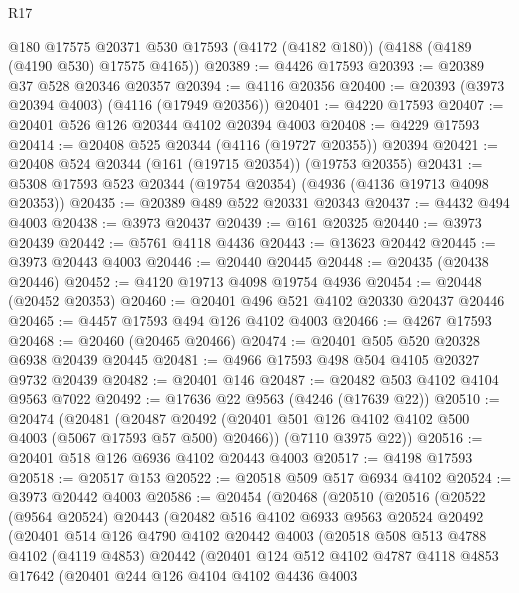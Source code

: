 \begin{lexlean}{R17}
\begin{coremodule}
    @180
    @17575
    @20371
    @530
    @17593
    (@4172 (@4182 @180))
    (@4188 (@4189 (@4190 @530) @17575 @4165))
@20389 := @4426 @17593
@20393 := @20389 @37 @528 @20346 @20357
@20394 := @4116 @20356
@20400 := @20393 (@3973 @20394 @4003) (@4116 (@17949 @20356))
@20401 := @4220 @17593
@20407 := @20401 @526 @126 @20344 @4102 @20394 @4003
@20408 := @4229 @17593
@20414 := @20408 @525 @20344 (@4116 (@19727 @20355)) @20394
@20421 := @20408 @524 @20344 (@161 (@19715 @20354)) (@19753 @20355)
@20431 := @5308 @17593 @523 @20344 (@19754 @20354) (@4936 (@4136 @19713 @4098 @20353))
@20435 := @20389 @489 @522 @20331 @20343
@20437 := @4432 @494 @4003
@20438 := @3973 @20437
@20439 := @161 @20325
@20440 := @3973 @20439
@20442 := @5761 @4118 @4436
@20443 := @13623 @20442
@20445 := @3973 @20443 @4003
@20446 := @20440 @20445
@20448 := @20435 (@20438 @20446)
@20452 := @4120 @19713 @4098 @19754 @4936
@20454 := @20448 (@20452 @20353)
@20460 := @20401 @496 @521 @4102 @20330 @20437 @20446
@20465 := @4457 @17593 @494 @126 @4102 @4003
@20466 := @4267 @17593
@20468 := @20460 (@20465 @20466)
@20474 := @20401 @505 @520 @20328 @6938 @20439 @20445
@20481 := @4966 @17593 @498 @504 @4105 @20327 @9732 @20439
@20482 := @20401 @146
@20487 := @20482 @503 @4102 @4104 @9563 @7022
@20492 := @17636 @22 @9563 (@4246 (@17639 @22))
@20510 := @20474
    (@20481
      (@20487 @20492 (@20401 @501 @126 @4102 @4102 @500 @4003 (@5067 @17593 @57 @500) @20466))
      (@7110 @3975 @22))
@20516 := @20401 @518 @126 @6936 @4102 @20443 @4003
@20517 := @4198 @17593
@20518 := @20517 @153
@20522 := @20518 @509 @517 @6934 @4102
@20524 := @3973 @20442 @4003
@20586 := @20454
    (@20468
      (@20510
        (@20516
          (@20522
            (@9564 @20524)
            @20443
            (@20482
              @516
              @4102
              @6933
              @9563
              @20524
              @20492
              (@20401
                @514
                @126
                @4790
                @4102
                @20442
                @4003
                (@20518
                  @508
                  @513
                  @4788
                  @4102
                  (@4119 @4853)
                  @20442
                  (@20401
                    @124
                    @512
                    @4102
                    @4787
                    @4118
                    @4853
                    @17642
                    (@20401
                      @244
                      @126
                      @4104
                      @4102
                      @4436
                      @4003

\end{coremodule}
\end{lexlean}
